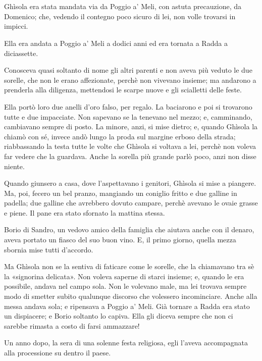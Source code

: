 \chapter{}

Ghìsola era stata mandata via da Poggio a' Meli, con astuta precauzione, da Domenico; che, vedendo il contegno poco sicuro di lei, non volle trovarsi in impicci.

Ella era andata a Poggio a' Meli a dodici anni ed era tornata a Radda a diciassette.

Conosceva quasi soltanto di nome gli altri parenti e non aveva più veduto le due sorelle, che non le erano affezionate, perchè non vivevano insieme; ma andarono a prenderla alla diligenza, mettendosi le scarpe nuove e gli scialletti delle feste.

Ella portò loro due anelli d'oro falso, per regalo. La baciarono e poi si trovarono tutte e due impacciate. Non sapevano se la tenevano nel mezzo; e, camminando, cambiavano sempre di posto. La minore, anzi, si mise dietro; e, quando Ghìsola la chiamò con sé, invece andò lungo la proda sul margine erboso della strada; riabbassando la testa tutte le volte che Ghìsola si voltava a lei, perchè non voleva far vedere che la guardava. Anche la sorella più grande parlò poco, anzi non disse niente.

Quando giunsero a casa, dove l'aspettavano i genitori, Ghìsola si mise a piangere. Ma, poi, fecero un bel pranzo, mangiando un coniglio fritto e due galline in padella; due galline che avrebbero dovuto campare, perchè avevano le ovaie grasse e piene. Il pane era stato sfornato la mattina stessa.

Borio di Sandro, un vedovo amico della famiglia che aiutava anche con il denaro, aveva portato un fiasco del suo buon vino. E, il primo giorno, quella mezza sbornia mise tutti d'accordo.

Ma Ghìsola non se la sentiva di faticare come le sorelle, che la chiamavano tra sè la «signorina delicata». Non voleva saperne di starci insieme; e, quando le era possibile, andava nel campo sola. Non le volevano male, ma lei trovava sempre modo di smetter subito qualunque discorso che volessero incominciare. Anche alla messa andava sola; e ripensava a Poggio a' Meli. Già tornare a Radda era stato un dispiacere; e Borio soltanto lo capiva. Ella gli diceva sempre che non ci sarebbe rimasta a costo di farsi ammazzare!

Un anno dopo, la sera di una solenne festa religiosa, egli l'aveva accompagnata alla processione su dentro il paese.

